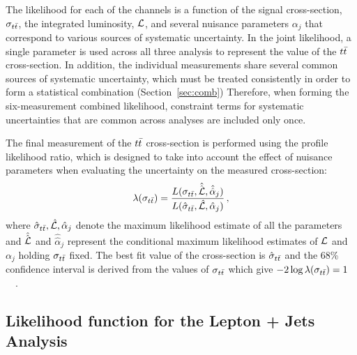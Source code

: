 The likelihood for each of the channels is a function of the signal cross-section, $\sigma_{t\bar{t}}$, the integrated luminosity, ${\cal L}$, and several nuisance parameters $\alpha_j$ that correspond to various sources of systematic uncertainty.
In the joint likelihood, a single parameter is used across all three analysis to represent the value of the $t\bar{t}$ cross-section.
In addition, the individual measurements share several common sources of systematic uncertainty,
which must be treated consistently in order to form a statistical combination (Section~\ref{sec:comb})
Therefore, when forming the six-measurement combined likelihood, constraint terms for systematic uncertainties that are common across analyses are included only once.


The final measurement of the $t\bar{t}$ cross-section is performed using the profile likelihood ratio,
which is designed to take into account the effect of nuisance parameters when evaluating the uncertainty on the measured cross-section:
\begin{equation}\label{Eq:lr_2}
  \lambda(\sigma_{t\bar{t}}) = \frac{L(\sigma_{t\bar{t}}, \hat{\hat{{\cal L}}}, \hat{\hat{\alpha}}_j)}{L(\hat \sigma_{t\bar{t}}, \hat {{\cal L}}, \hat \alpha_j)}\,,
\end{equation}
where  $\hat\sigma_{t\bar{t}}, \hat {{\cal L}}, \hat\alpha_j$ denote the maximum likelihood estimate of all the parameters and  $\hat{\hat{{\cal L}}}$ and $\hat{\hat{\alpha}}_j$ represent the conditional maximum likelihood estimates of ${\cal L}$ and $\alpha_j$ holding $\sigma_{t\bar{t}}$ fixed.   The best fit value of the cross-section is $\hat\sigma_{t\bar{t}}$ and the 68\% confidence interval is derived from the values of $\sigma_{t\bar{t}}$ which give $-2\log \lambda(\sigma_{t\bar{t}})= 1$~\cite{minuit}~\cite{asimov}.


\subsection{Likelihood function for the Lepton + Jets Analysis}

\label{sec:lepjets}

